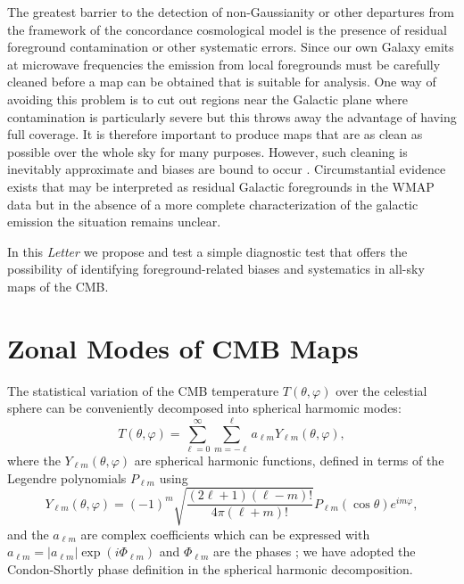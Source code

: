 \documentclass[useAMS,usenatbib,usegraphicx]{mn2e}
\def\l{{\ell}}
\def\lm{{\l m}}
\def\summ{\sum_{m=-\ell}^{\ell}}
\def\suml{\sum_{\ell=0}^{\infty}}
\def\alm{a_{\lm}}
\def\ylm{Y_{\lm}}
\begin{document}
The greatest barrier to the detection of non-Gaussianity or other
departures from the framework of the concordance cosmological model
is the presence of residual foreground contamination or other
systematic errors. Since our own Galaxy emits at microwave
frequencies the emission from local foregrounds must be carefully
cleaned before a map can be obtained that is suitable for analysis.
One way of avoiding this problem is to cut out regions near the
Galactic plane where contamination is particularly severe but this
throws away the advantage of having full coverage. It is therefore
important to produce maps that are as clean as possible over the
whole sky for many purposes. However, such cleaning is inevitably
approximate and biases are bound to occur \citep{b6,nvn,cnc3}.
Circumstantial evidence exists that may be interpreted as residual
Galactic foregrounds in the WMAP data \citep{cnc2,ch07} but in the
absence of a more complete characterization of the galactic emission
the situation remains unclear.

In this {\em Letter} we propose and test a simple diagnostic test
that offers the possibility of identifying foreground-related biases
and systematics in all-sky maps of the CMB.

\section{Zonal Modes of CMB Maps}

The statistical variation of the CMB temperature $T(\theta,\varphi)$
over the celestial sphere can be conveniently decomposed into
spherical harmomic modes:
\begin{equation}
T(\theta,\varphi)=\suml \summ \alm \ylm (\theta,\varphi),
\end{equation}
where the $\ylm(\theta,\varphi) $ are spherical harmonic functions,
defined in terms of the Legendre polynomials $P_\lm$ using
\begin{equation}
\ylm(\theta,\varphi)=(-1)^m
\sqrt{\frac{(2\l+1)(\l-m)!}{4\pi(\l+m)!}}P_\lm(\cos\theta)e^{i m
\varphi},
\end{equation}
and the $\alm$ are complex coefficients which can be expressed with
$\alm=|\alm| \exp(i \Phi_\lm)$ and $\Phi_\lm$ are the phases
\citep{coles,cnc1,cnc2,cnc3,sc}; we have adopted the Condon-Shortly
phase definition in the spherical harmonic decomposition.
\end{document}
